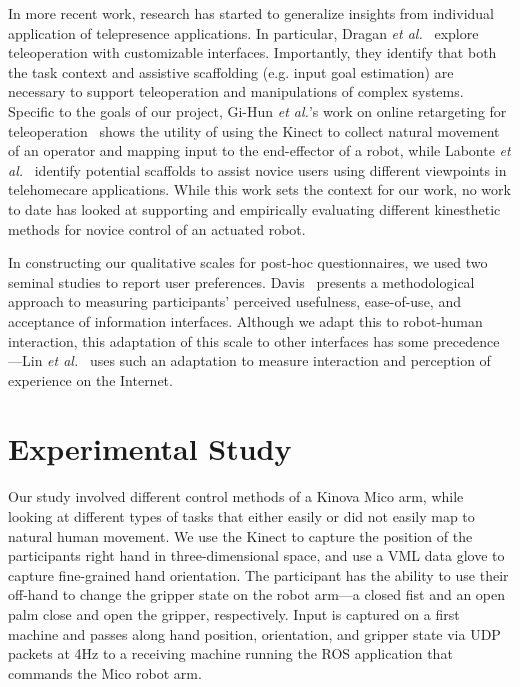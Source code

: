 \documentclass{sigchi}
\begin{document}
In more recent work, research has started to generalize insights from individual application of telepresence applications.  In particular, Dragan \emph{et al.}~\cite{dragan2013teleoperation} explore teleoperation with customizable interfaces.  Importantly, they identify that both the task context and assistive scaffolding (e.g. input goal estimation) are necessary to support teleoperation and manipulations of complex systems. Specific to the goals of our project, Gi-Hun \emph{et al.}'s work on online retargeting for teleoperation~\cite{yang2013online} shows the utility of using the Kinect to collect natural movement of an operator and mapping input to the end-effector of a robot, while Labonte \emph{et al.}~\cite{labonte2010comparative} identify potential scaffolds to assist novice users using different viewpoints in telehomecare applications.  While this work sets the context for our work, no work to date has looked at supporting and empirically evaluating different kinesthetic methods for novice control of an actuated robot.

In constructing our qualitative scales for post-hoc questionnaires, we used two seminal studies to report user preferences.  Davis~\cite{Davis1989} presents a methodological approach to measuring participants' perceived usefulness, ease-of-use, and acceptance of information interfaces. Although we adapt this to robot-human interaction, this adaptation of this scale to other interfaces has some precedence---Lin \emph{et al.}~\cite{Lin2008} uses such an adaptation to measure interaction and perception of experience on the Internet.  

\section{Experimental Study}

Our study involved different control methods of a Kinova Mico arm, while looking at different types of tasks that either easily or did not easily map to natural human movement.  
We use the Kinect to capture the position of the participants right hand in three-dimensional space, and use a VML data glove to capture fine-grained hand orientation.  The participant has the ability to use their off-hand to change the gripper state on the robot arm---a closed fist and an open palm close and open the gripper, respectively.  Input is captured on a first machine and passes along hand position, orientation, and gripper state via UDP packets at 4Hz to a receiving machine running the ROS application that commands the Mico robot arm. 
\end{document}
